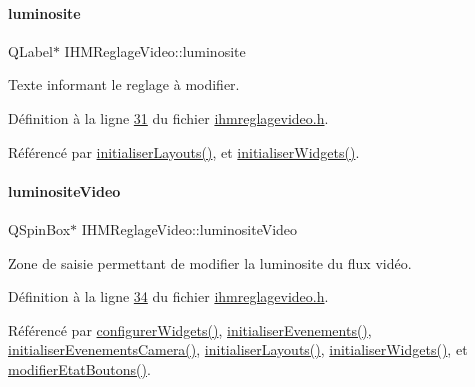 \mbox{\label{class_i_h_m_reglage_video_a16b65877af48863d0752e226371952ab}} 
\paragraph{\texorpdfstring{luminosite}{luminosite}}
{\footnotesize\ttfamily Q\+Label$\ast$ I\+H\+M\+Reglage\+Video\+::luminosite\hspace{0.3cm}{\ttfamily [private]}}



Texte informant le reglage à modifier. 



Définition à la ligne \hyperlink{ihmreglagevideo_8h_source_l00031}{31} du fichier \hyperlink{ihmreglagevideo_8h_source}{ihmreglagevideo.\+h}.



Référencé par \hyperlink{ihmreglagevideo_8cpp_source_l00061}{initialiser\+Layouts()}, et \hyperlink{ihmreglagevideo_8cpp_source_l00023}{initialiser\+Widgets()}.

\mbox{\label{class_i_h_m_reglage_video_a9109c0801d582917e78e57c350510ea7}} 
\paragraph{\texorpdfstring{luminosite\+Video}{luminositeVideo}}
{\footnotesize\ttfamily Q\+Spin\+Box$\ast$ I\+H\+M\+Reglage\+Video\+::luminosite\+Video\hspace{0.3cm}{\ttfamily [private]}}



Zone de saisie permettant de modifier la luminosite du flux vidéo. 



Définition à la ligne \hyperlink{ihmreglagevideo_8h_source_l00034}{34} du fichier \hyperlink{ihmreglagevideo_8h_source}{ihmreglagevideo.\+h}.



Référencé par \hyperlink{ihmreglagevideo_8cpp_source_l00047}{configurer\+Widgets()}, \hyperlink{ihmreglagevideo_8cpp_source_l00105}{initialiser\+Evenements()}, \hyperlink{ihmreglagevideo_8cpp_source_l00117}{initialiser\+Evenements\+Camera()}, \hyperlink{ihmreglagevideo_8cpp_source_l00061}{initialiser\+Layouts()}, \hyperlink{ihmreglagevideo_8cpp_source_l00023}{initialiser\+Widgets()}, et \hyperlink{ihmreglagevideo_8cpp_source_l00212}{modifier\+Etat\+Boutons()}.

